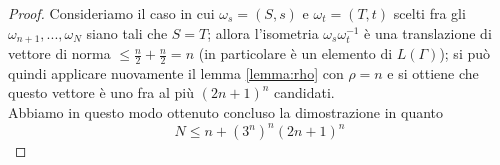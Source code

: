 \documentclass[a4paper,11pt,openright,twoside	]{book}
\begin{document}
\begin{proof}
Consideriamo il caso in cui $\omega_s = (S,s) $ e $\omega_t = (T,t)$ scelti fra gli $\omega_{n+1},...,\omega_N $ siano tali che $S = T$; allora l'isometria $\omega_s \omega_t^{-1}$ è una translazione di vettore di norma $\leq \frac{n}{2} + \frac{n}{2} = n$ (in particolare è un elemento di $L(\Gamma)$);  si può quindi applicare nuovamente il lemma \ref{lemma:rho} con $\rho = n$ e si ottiene che questo vettore è uno fra al più $(2n+1)^n$ candidati. \\
Abbiamo in questo modo ottenuto concluso la dimostrazione in quanto 
\[ N \leq n + (3^n)^n (2n+1)^n\]
\end{proof}
	
\end{document}

